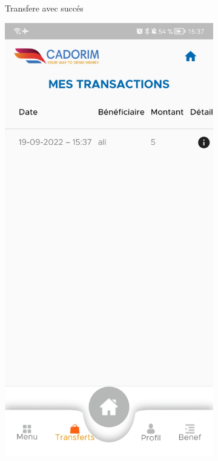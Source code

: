 \begin{figure}
\begin{subfigure}[b]{0.3\textwidth}
			\caption{Transfere avec succés}
			\label{fig:y equals x}
		\end{subfigure}
		\hfill
		\begin{subfigure}[b]{0.3\textwidth}
			\centering
			\includegraphics[width=\textwidth]{./Template LaTeX/Images/17.jpg}

\end{subfigure}
\end{figure}
